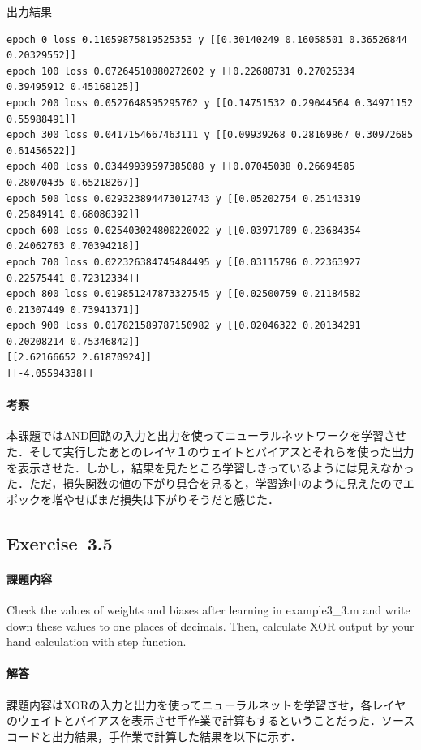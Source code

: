 \documentclass[11pt, a4paper]{jsarticle}
\begin{document}
  \begin{itembox}[l]{出力結果}
    {\footnotesize
    \begin{verbatim}
epoch 0 loss 0.11059875819525353 y [[0.30140249 0.16058501 0.36526844 0.20329552]]
epoch 100 loss 0.07264510880272602 y [[0.22688731 0.27025334 0.39495912 0.45168125]]
epoch 200 loss 0.0527648595295762 y [[0.14751532 0.29044564 0.34971152 0.55988491]]
epoch 300 loss 0.0417154667463111 y [[0.09939268 0.28169867 0.30972685 0.61456522]]
epoch 400 loss 0.03449939597385088 y [[0.07045038 0.26694585 0.28070435 0.65218267]]
epoch 500 loss 0.029323894473012743 y [[0.05202754 0.25143319 0.25849141 0.68086392]]
epoch 600 loss 0.025403024800220022 y [[0.03971709 0.23684354 0.24062763 0.70394218]]
epoch 700 loss 0.022326384745484495 y [[0.03115796 0.22363927 0.22575441 0.72312334]]
epoch 800 loss 0.019851247873327545 y [[0.02500759 0.21184582 0.21307449 0.73941371]]
epoch 900 loss 0.017821589787150982 y [[0.02046322 0.20134291 0.20208214 0.75346842]]
[[2.62166652 2.61870924]]
[[-4.05594338]]
    \end{verbatim}}
  \end{itembox}

  \paragraph{ 考察}
  本課題ではAND回路の入力と出力を使ってニューラルネットワークを学習させた．そして実行したあとのレイヤ１のウェイトとバイアスとそれらを使った出力を表示させた．しかし，結果を見たところ学習しきっているようには見えなかった．ただ，損失関数の値の下がり具合を見ると，学習途中のように見えたのでエポックを増やせばまだ損失は下がりそうだと感じた．

  \subsection{Exercise~3.5}
  \paragraph{ 課題内容}
  Check the values of weights and biases after learning in example3\_3.m and write down these values to one places of decimals. Then, calculate XOR output by your hand calculation with step function.

  \paragraph{ 解答}
  課題内容はXORの入力と出力を使ってニューラルネットを学習させ，各レイヤのウェイトとバイアスを表示させ手作業で計算もするということだった．ソースコードと出力結果，手作業で計算した結果を以下に示す．
\end{document}
